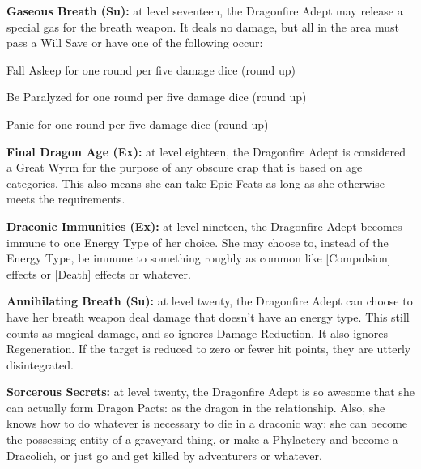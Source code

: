 \textbf{Gaseous Breath (Su):} at level seventeen, the Dragonfire Adept may release a special gas for the breath weapon. It deals no damage, but all in the area must pass a Will Save or have one of the following occur:

\begin{itemize*}
\item Fall Asleep for one round per five damage dice (round up)
\item Be Paralyzed for one round per five damage dice (round up)
\item Panic for one round per five damage dice (round up)
\end{itemize*}

\textbf{Final Dragon Age (Ex):} at level eighteen, the Dragonfire Adept is considered a Great Wyrm for the purpose of any obscure crap that is based on age categories. This also means she can take Epic Feats as long as she otherwise meets the requirements.

\textbf{Draconic Immunities (Ex):} at level nineteen, the Dragonfire Adept becomes immune to one Energy Type of her choice. She may choose to, instead of the Energy Type, be immune to something roughly as common like [Compulsion] effects or [Death] effects or whatever.

\textbf{Annihilating Breath (Su):} at level twenty, the Dragonfire Adept can choose to have her breath weapon deal damage that doesn't have an energy type. This still counts as magical damage, and so ignores Damage Reduction. It also ignores Regeneration. If the target is reduced to zero or fewer hit points, they are utterly disintegrated.

\textbf{Sorcerous Secrets:} at level twenty, the Dragonfire Adept is so awesome that she can actually form Dragon Pacts: as the dragon in the relationship. Also, she knows how to do whatever is necessary to die in a draconic way: she can become the possessing entity of a graveyard thing, or make a Phylactery and become a Dracolich, or just go and get killed by adventurers or whatever.